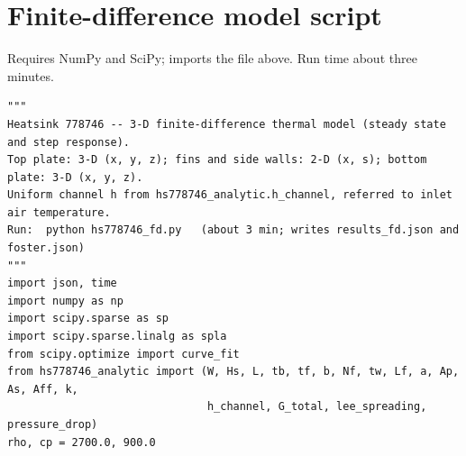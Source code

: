 \documentclass[11pt,a4paper]{article}
\begin{document}
\section{Finite-difference model script}\label{app:fd}
Requires NumPy and SciPy; imports the file above. Run time about three minutes.
\begin{lstlisting}
"""
Heatsink 778746 -- 3-D finite-difference thermal model (steady state and step response).
Top plate: 3-D (x, y, z); fins and side walls: 2-D (x, s); bottom plate: 3-D (x, y, z).
Uniform channel h from hs778746_analytic.h_channel, referred to inlet air temperature.
Run:  python hs778746_fd.py   (about 3 min; writes results_fd.json and foster.json)
"""
import json, time
import numpy as np
import scipy.sparse as sp
import scipy.sparse.linalg as spla
from scipy.optimize import curve_fit
from hs778746_analytic import (W, Hs, L, tb, tf, b, Nf, tw, Lf, a, Ap, As, Aff, k,
                               h_channel, G_total, lee_spreading, pressure_drop)
rho, cp = 2700.0, 900.0


\end{lstlisting}
\end{document}
